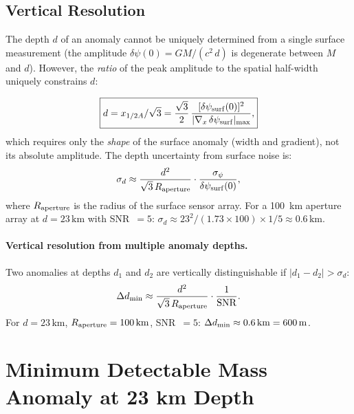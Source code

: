 \documentclass[aps,prd,twocolumn,superscriptaddress,nofootinbib]{revtex4-2}
\newcommand{\SNR}{\mathrm{SNR}}
\newcommand{\km}{\,\mathrm{km}}
\begin{document}
\subsection{Vertical Resolution}

The depth $d$ of an anomaly cannot be uniquely determined from a single
surface measurement (the amplitude $\delta\psi(0) = GM/(c^2\,d)$
is degenerate between $M$ and $d$).  However, the \emph{ratio} of the
peak amplitude to the spatial half-width uniquely constrains $d$:

\begin{equation}
  \boxed{
  d = x_{1/2A} / \sqrt{3}
  = \frac{\sqrt{3}}{2}\,\frac{[\delta\psi_{\rm surf}(0)]^2}
  {|\nabla_x\,\delta\psi_{\rm surf}|_{\max}},
  }
  \label{eq:depth-infer}
\end{equation}
which requires only the \emph{shape} of the surface anomaly (width and
gradient), not its absolute amplitude.  The depth uncertainty from
surface noise is:
\begin{equation}
  \sigma_d \approx \frac{d^2}{\sqrt{3}\,R_{\rm aperture}}
  \cdot \frac{\sigma_\psi}{\delta\psi_{\rm surf}(0)},
  \label{eq:depth-uncertainty}
\end{equation}
where $R_{\rm aperture}$ is the radius of the surface sensor array.
For a 100~km aperture array at $d = 23\km$ with SNR~$= 5$:
$\sigma_d \approx 23^2/(1.73\times100)\times1/5 \approx 0.6\km$.

\paragraph{Vertical resolution from multiple anomaly depths.}
Two anomalies at depths $d_1$ and $d_2$ are vertically distinguishable
if $|d_1 - d_2| > \sigma_d$:
\begin{equation}
  \Delta d_{\rm min} \approx \frac{d^2}{\sqrt{3}\,R_{\rm aperture}}
  \cdot \frac{1}{\SNR}.
  \label{eq:vert-resolution}
\end{equation}
For $d = 23\km$, $R_{\rm aperture} = 100\km$, SNR~$= 5$:
$\Delta d_{\rm min} \approx 0.6\km = 600\,\mathrm{m}$.

\section{Minimum Detectable Mass Anomaly at 23 km Depth}
\label{sec:sensitivity}
\end{document}
